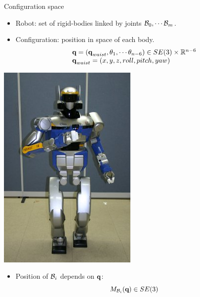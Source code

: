 \begin{frame} {Configuration space}
  \parbox{.71\linewidth} {
  \begin{itemize}
    \item Robot: set of rigid-bodies linked by joints ${\cal B}_0,\cdots{\cal B}_m$.
      \pause
    \item Configuration: position in space of each body.
      $$
      \begin{array}{l}
        \textbf{q} = (\textbf{q}_{waist}, \theta_1, \cdots \theta_{n-6}) \in SE(3) \times \mathbb{R}^{n-6}\\
        \textbf{q}_{waist} = (x, y, z, roll, pitch, yaw)
      \end{array}
      $$
  \end{itemize}
  }
  \parbox {.28\linewidth} {
    \centerline {
      \includegraphics[width=\linewidth]{figures/hrp2.jpg}
    }
  }
  \pause
  \begin{itemize}
  \item Position of ${\cal B}_i$ depends on $\textbf{q}$:
    $$M_{{\cal B}_i} (\textbf{q}) \in SE(3)$$
    
  \end{itemize}
\end{frame}

